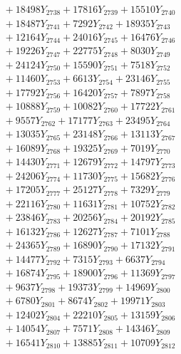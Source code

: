 \documentclass[a4paper,10pt]{article}
\begin{document}
{\begin{align}
&\;  + 18498 Y_{2738} + 17816 Y_{2739} + 15510 Y_{2740} \\[0.3ex]
&\;  + 18487 Y_{2741} + 7292 Y_{2742} + 18935 Y_{2743} \\[0.3ex]
&\;  + 12164 Y_{2744} + 24016 Y_{2745} + 16476 Y_{2746} \\[0.3ex]
&\;  + 19226 Y_{2747} + 22775 Y_{2748} + 8030 Y_{2749} \\[0.3ex]
&\;  + 24124 Y_{2750} + 15590 Y_{2751} + 7518 Y_{2752} \\[0.3ex]
&\;  + 11460 Y_{2753} + 6613 Y_{2754} + 23146 Y_{2755} \\[0.3ex]
&\;  + 17792 Y_{2756} + 16420 Y_{2757} + 7897 Y_{2758} \\[0.5ex]\allowbreak
&\;  + 10888 Y_{2759} + 10082 Y_{2760} + 17722 Y_{2761} \\[0.3ex]
&\;  + 9557 Y_{2762} + 17177 Y_{2763} + 23495 Y_{2764} \\[0.3ex]
&\;  + 13035 Y_{2765} + 23148 Y_{2766} + 13113 Y_{2767} \\[0.3ex]
&\;  + 16089 Y_{2768} + 19325 Y_{2769} + 7019 Y_{2770} \\[0.3ex]
&\;  + 14430 Y_{2771} + 12679 Y_{2772} + 14797 Y_{2773} \\[0.3ex]
&\;  + 24206 Y_{2774} + 11730 Y_{2775} + 15682 Y_{2776} \\[0.3ex]
&\;  + 17205 Y_{2777} + 25127 Y_{2778} + 7329 Y_{2779} \\[0.3ex]
&\;  + 22116 Y_{2780} + 11631 Y_{2781} + 10752 Y_{2782} \\[0.3ex]
&\;  + 23846 Y_{2783} + 20256 Y_{2784} + 20192 Y_{2785} \\[0.3ex]
&\;  + 16132 Y_{2786} + 12627 Y_{2787} + 7101 Y_{2788} \\[0.5ex]\allowbreak
&\;  + 24365 Y_{2789} + 16890 Y_{2790} + 17132 Y_{2791} \\[0.3ex]
&\;  + 14477 Y_{2792} + 7315 Y_{2793} + 6637 Y_{2794} \\[0.3ex]
&\;  + 16874 Y_{2795} + 18900 Y_{2796} + 11369 Y_{2797} \\[0.3ex]
&\;  + 9637 Y_{2798} + 19373 Y_{2799} + 14969 Y_{2800} \\[0.3ex]
&\;  + 6780 Y_{2801} + 8674 Y_{2802} + 19971 Y_{2803} \\[0.3ex]
&\;  + 12402 Y_{2804} + 22210 Y_{2805} + 13159 Y_{2806} \\[0.3ex]
&\;  + 14054 Y_{2807} + 7571 Y_{2808} + 14346 Y_{2809} \\[0.3ex]
&\;  + 16541 Y_{2810} + 13885 Y_{2811} + 10709 Y_{2812} \\[0.3ex]

\end{align}}
\end{document}
